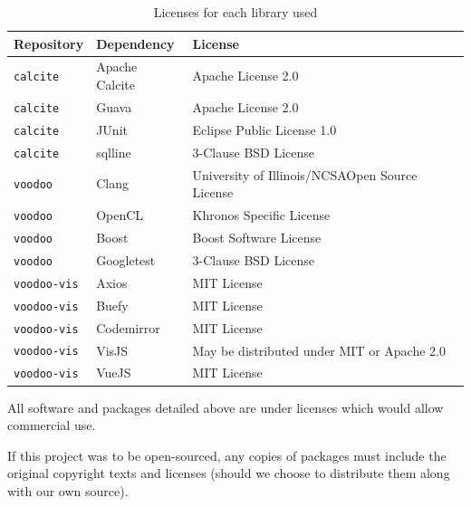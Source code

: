\begin{table}[h]
    \centering
    \begin{tabular}{l l l}
        \hline
        \textbf{Repository} & \textbf{Dependency} & \textbf{License} \\
        \hline
        \texttt{calcite}    & Apache Calcite & Apache License 2.0 \\
        \texttt{calcite}    & Guava          & Apache License 2.0 \\
        \texttt{calcite}    & JUnit          & Eclipse Public License 1.0 \\
        \texttt{calcite}    & sqlline        & 3-Clause BSD License \\ 
        \hline
        \texttt{voodoo}     & Clang          & University of Illinois/NCSAOpen Source License \\
        \texttt{voodoo}     & OpenCL         & Khronos Specific License \\
        \texttt{voodoo}     & Boost          & Boost Software License \\
        \texttt{voodoo}     & Googletest     & 3-Clause BSD License \\
        \hline
        \texttt{voodoo-vis} & Axios          & MIT License \\
        \texttt{voodoo-vis} & Buefy          & MIT License \\
        \texttt{voodoo-vis} & Codemirror     & MIT License \\
        \texttt{voodoo-vis} & VisJS          & May be distributed under MIT or Apache 2.0 \\
        \texttt{voodoo-vis} & VueJS          & MIT License \\
        \hline
    \end{tabular}
    \caption{\label{table:dependencies}Licenses for each library used}
\end{table}

All software and packages detailed above are under licenses which would allow commercial use.

If this project was to be open-sourced, any copies of packages must include the original copyright texts and licenses (should we choose to distribute them along with our own source).
